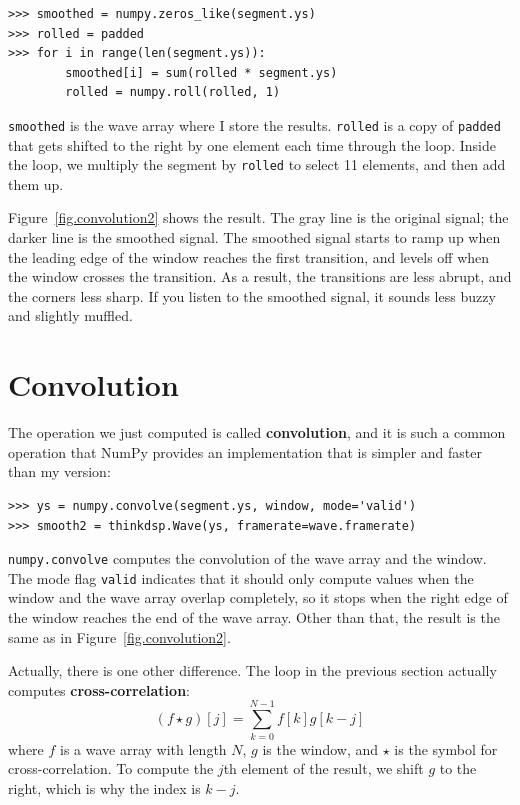 \documentclass[12pt]{book}
\begin{document}
\begin{verbatim}
>>> smoothed = numpy.zeros_like(segment.ys)
>>> rolled = padded
>>> for i in range(len(segment.ys)):
        smoothed[i] = sum(rolled * segment.ys)
        rolled = numpy.roll(rolled, 1)
\end{verbatim}

{\tt smoothed} is the wave array where I store the results.
{\tt rolled} is a copy of {\tt padded} that gets shifted to
the right by one element each time through the loop.  Inside
the loop, we multiply the segment by {\tt rolled} to select
11 elements, and then add them up.

Figure~\ref{fig.convolution2} shows the result.  The gray line
is the original signal; the darker line is the smoothed signal.
The smoothed signal starts to ramp up when the leading edge of
the window reaches the first transition, and levels off when
the window crosses the transition.  As a result, the transitions
are less abrupt, and the corners less sharp.  If you listen
to the smoothed signal, it sounds less buzzy and slightly muffled.


\section{Convolution}
\label{convolution}

The operation we just computed is called {\bf convolution},
and it is such a common operation that NumPy provides an
implementation that is simpler and faster than my version:

\begin{verbatim}
>>> ys = numpy.convolve(segment.ys, window, mode='valid')
>>> smooth2 = thinkdsp.Wave(ys, framerate=wave.framerate)
\end{verbatim}

{\tt numpy.convolve} computes the convolution of the wave
array and the window.  The mode flag {\tt valid} indicates
that it should only compute values when the window and the
wave array overlap completely, so it stops when the right
edge of the window reaches the end of the wave array.  Other
than that, the result is the same as in Figure~\ref{fig.convolution2}.

\newcommand{\conv}{\ast}

Actually, there is one other difference.  The loop in the
previous section actually computes {\bf cross-correlation}:
%
\[ (f \star g)[j] = \sum_{k=0}^{N-1} f[k] g[k-j]  \]
%
where $f$ is a wave array with length $N$, $g$ is the window,
and $\star$ is the symbol for cross-correlation.  To
compute the $j$th element of the result, we shift $g$ to
the right, which is why the index is $k-j$.
\end{document}
